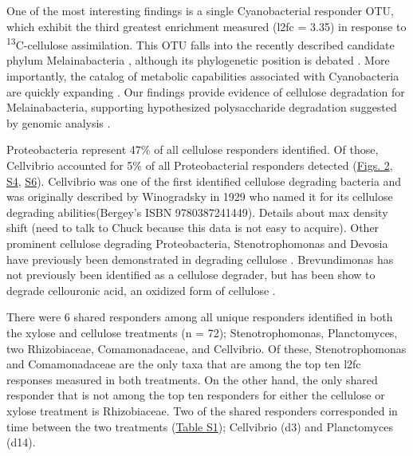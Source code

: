 One of the most interesting findings is a single Cyanobacterial responder OTU, which exhibit the third greatest enrichment measured (l2fc = 3.35) in response to \textsuperscript{13}C-cellulose assimilation. This OTU falls into the recently described candidate phylum Melainabacteria \cite{Di_Rienzi_2013}, although its phylogenetic position is debated \cite{Soo_2014}. More importantly, the catalog of metabolic capabilities associated with Cyanobacteria are quickly expanding \cite{Di_Rienzi_2013, Soo_2014}. Our findings provide evidence of cellulose degradation for Melainabacteria, supporting hypothesized polysaccharide degradation suggested by genomic analysis \cite{Di_Rienzi_2013}.     

Proteobacteria represent 47\% of all cellulose responders identified.  Of those, Cellvibrio accounted for 5\% of all Proteobacterial responders detected (\href{https://www.authorea.com/users/3537/articles/3612/master/file/figures/l2fc_fig1/l2fc_fig.pdf}{Figs. 2}, \href{https://authorea.com/users/3537/articles/8459/master/file/figures/l2fc_fig_pVal/l2fc_fig_pVal.png}{S4}, \href{https://authorea.com/users/3537/articles/8459/master/file/figures/cellulose_resp_profiles/cellulose_resp_profiles.png}{S6}). Cellvibrio was one of the first identified cellulose degrading bacteria and was originally described by Winogradsky in 1929 who named it for its cellulose degrading abilities(Bergey's ISBN 9780387241449). Details about max density shift (need to talk to Chuck because this data is not easy to acquire). Other prominent cellulose degrading Proteobacteria, Stenotrophomonas and Devosia have previously been demonstrated in degrading cellulose \cite{Trujillo_Cabrera_2012, Verastegui_2014}. Brevundimonas has not previously been identified as a cellulose degrader, but has been show to degrade cellouronic acid, an oxidized form of cellulose \cite{Tavernier_2008}.

There were 6 shared responders among all unique responders identified in both the xylose and cellulose treatments (n = 72); Stenotrophomonas, Planctomyces, two Rhizobiaceae, Comamonadaceae, and Cellvibrio. Of these, Stenotrophomonas and Comamonadaceae are the only taxa that are among the top ten l2fc responses measured in both treatments. On the other hand, the only shared responder that is not among the top ten responders for either the cellulose or xylose treatment is Rhizobiaceae. Two of the shared responders corresponded in time between the two treatments (\href{https://authorea.com/users/3537/articles/8459/master/file/figures/resp_table/resp_table.png}{Table S1}); Cellvibrio (d3) and Planctomyces (d14).  

